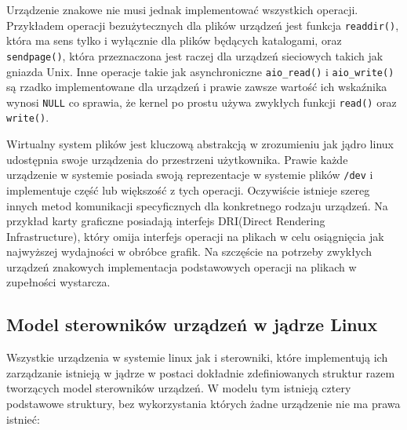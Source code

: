 \documentclass[11pt]{scrartcl}
\begin{document}
Urządzenie znakowe nie musi jednak implementować wszystkich operacji.  Przykładem operacji bezużytecznych dla plików urządzeń jest funkcja \texttt{readdir()}, która ma sens tylko i wyłącznie dla plików będących katalogami, oraz \texttt{sendpage()}, która przeznaczona jest raczej dla urządzeń sieciowych takich jak gniazda Unix. Inne operacje takie jak asynchroniczne \texttt{aio\_read()} i \texttt{aio\_write()} są rzadko implementowane dla urządzeń i prawie zawsze wartość ich wskaźnika wynosi \texttt{NULL} co sprawia, że kernel po prostu używa zwykłych funkcji \texttt{read()} oraz \texttt{write()}.

Wirtualny system plików jest kluczową abstrakcją w zrozumieniu jak jądro linux udostępnia swoje urządzenia do przestrzeni użytkownika. Prawie każde urządzenie w systemie posiada swoją reprezentacje w systemie plików \texttt{/dev} i implementuje część lub większość z tych operacji. Oczywiście istnieje szereg innych metod komunikacji specyficznych dla konkretnego rodzaju urządzeń. Na przykład karty graficzne posiadają interfejs DRI(Direct Rendering Infrastructure), który omija interfejs operacji na plikach w celu osiągnięcia jak najwyższej wydajności w obróbce grafik. Na szczęście na potrzeby zwykłych urządzeń znakowych implementacja podstawowych operacji na plikach w zupełności wystarcza.

\subsection{Model sterowników urządzeń w jądrze Linux}
\label{linuxdrivermodel}

Wszystkie urządzenia w systemie linux jak i sterowniki, które implementują ich zarządzanie istnieją w jądrze w postaci dokładnie zdefiniowanych struktur razem tworzących model sterowników urządzeń.  W modelu tym istnieją cztery podstawowe struktury, bez wykorzystania których żadne urządzenie nie ma prawa istnieć:
\end{document}
